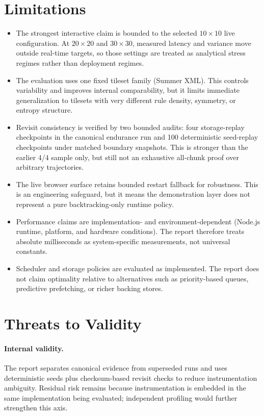 \documentclass[12pt,a4paper]{report}
\begin{document}
\section{Limitations}
\begin{itemize}
\item The strongest interactive claim is bounded to the selected $10\times10$ live configuration. At $20\times20$ and $30\times30$, measured latency and variance move outside real-time targets, so those settings are treated as analytical stress regimes rather than deployment regimes.
\item The evaluation uses one fixed tileset family (Summer XML). This controls variability and improves internal comparability, but it limits immediate generalization to tilesets with very different rule density, symmetry, or entropy structure.
\item Revisit consistency is verified by two bounded audits: four storage-replay checkpoints in the canonical endurance run and 100 deterministic seed-replay checkpoints under matched boundary snapshots. This is stronger than the earlier 4/4 sample only, but still not an exhaustive all-chunk proof over arbitrary trajectories.
\item The live browser surface retains bounded restart fallback for robustness. This is an engineering safeguard, but it means the demonstration layer does not represent a pure backtracking-only runtime policy.
\item Performance claims are implementation- and environment-dependent (Node.js runtime, platform, and hardware conditions). The report therefore treats absolute milliseconds as system-specific measurements, not universal constants.
\item Scheduler and storage policies are evaluated as implemented. The report does not claim optimality relative to alternatives such as priority-based queues, predictive prefetching, or richer backing stores.
\end{itemize}

\section{Threats to Validity}
\paragraph{Internal validity.} The report separates canonical evidence from superseded runs and uses deterministic seeds plus checksum-based revisit checks to reduce instrumentation ambiguity. Residual risk remains because instrumentation is embedded in the same implementation being evaluated; independent profiling would further strengthen this axis.
\end{document}
